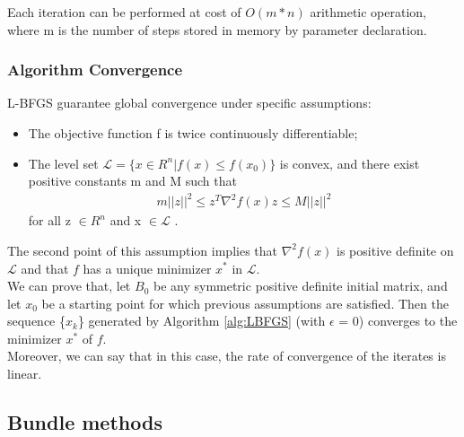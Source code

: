 Each iteration can be performed at cost of $O(m*n)$ arithmetic operation, where m is the number of steps stored in memory by parameter declaration.

\subsubsection{Algorithm Convergence}

L-BFGS guarantee global convergence under specific assumptions:
\begin{itemize} \label{convergence:assumption}
	\item The objective function f is twice continuously differentiable;
	\item The level set $ \mathcal{L} = \{x \in R^n | \mathit{f(x)}  \leq  \mathit{f(x_0)}\}$ is convex, and there exist positive constants m and M such that 
	\begin{align}
	m||z||^2 \leq z^T \nabla^2f(x)z \leq M||z||^2
	\end{align}
	for all z $\in R^n$  and x $\in \mathcal{L}$ .
\end{itemize}

The second point of this assumption implies that $\nabla^2f(x)$ is positive definite on $\mathcal{L}$ and that $\mathit{f}$ has a unique minimizer $x^*$ in $\mathcal{L}$.
\\
We can prove that, let $B_0$ be any symmetric positive definite initial matrix, and let $x_0$ be a starting point for which previous assumptions are satisfied. Then the sequence \{$x_k$\} generated by Algorithm \ref{alg:LBFGS} (with $\epsilon$ = 0) converges to the minimizer $x^*$ of $\mathit{f}$.
\\
Moreover, we can say that in this case, the rate of convergence of the iterates
is linear.






 

\subsection{Bundle methods}


